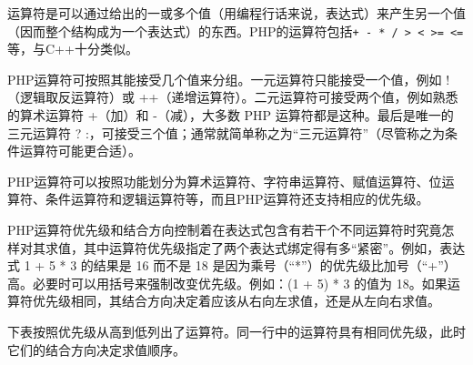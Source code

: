 运算符是可以通过给出的一或多个值（用编程行话来说，表达式）来产生另一个值（因而整个结构成为一个表达式）的东西。PHP的运算符包括\verb|+ - * / > < >= <=|等，与C++十分类似。

PHP运算符可按照其能接受几个值来分组。一元运算符只能接受一个值，例如 !（逻辑取反运算符）或 +\/+（递增运算符）。二元运算符可接受两个值，例如熟悉的算术运算符 +（加）和 -（减），大多数 PHP 运算符都是这种。最后是唯一的三元运算符 ? :，可接受三个值；通常就简单称之为“三元运算符”（尽管称之为条件运算符可能更合适）。

PHP运算符可以按照功能划分为算术运算符、字符串运算符、赋值运算符、位运算符、条件运算符和逻辑运算符等，而且PHP运算符还支持相应的优先级。




PHP运算符优先级和结合方向控制着在表达式包含有若干个不同运算符时究竟怎样对其求值，其中运算符优先级指定了两个表达式绑定得有多“紧密”。例如，表达式 1 + 5 * 3 的结果是 16 而不是 18 是因为乘号（“*”）的优先级比加号（“+”）高。必要时可以用括号来强制改变优先级。例如：(1 + 5) * 3 的值为 18。如果运算符优先级相同，其结合方向决定着应该从右向左求值，还是从左向右求值。


下表按照优先级从高到低列出了运算符。同一行中的运算符具有相同优先级，此时它们的结合方向决定求值顺序。


